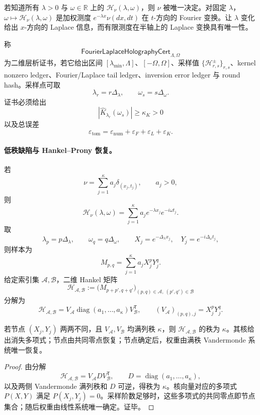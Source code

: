 若知道所有 \(\lambda>0\) 与 \(\omega\in\mathbb R\) 上的 \(\mathcal H_\nu(\lambda,\omega)\)，则 \(\nu\) 被唯一决定。对固定 \(\lambda\)，\(\omega\mapsto\mathcal H_\nu(\lambda,\omega)\) 是加权测度 \(e^{-\lambda x}\nu(dx,dt)\) 在 \(t\)-方向的 Fourier 变换。让 \(\lambda\) 变化给出 \(x\)-方向的 Laplace 信息，而有限测度在半轴上的 Laplace 变换具有唯一性。

\begin{definition}\label{def:typed-address-biaxial-completion-fourier-laplace-holography-cert}
称
\[
\mathsf{FourierLaplaceHolographyCert}_{\Lambda,\Omega}
\]
为二维层析证书，若它给出区间 \([\lambda_{\min},\Lambda]\)、\([-\Omega,\Omega]\)、采样值 \(\{\mathcal H_{r,s}^{\pm}\}_{r,s}\)、kernel nonzero ledger、Fourier/Laplace tail ledger、inversion error ledger 与 round hash。采样点可取
\[
\lambda_r=r\Delta_\lambda,\qquad \omega_s=s\Delta_\omega.
\]
证书必须给出
\[
|\widehat K_{\lambda_r}(\omega_s)|\ge\kappa_K>0
\]
以及总误差
\[
\varepsilon_{\mathrm{tom}}
=
\varepsilon_{\mathrm{num}}+\varepsilon_F+\varepsilon_L+\varepsilon_K.
\]
\end{definition}

\paragraph{低秩缺陷与 Hankel--Prony 恢复。}
若
\[
\nu=\sum_{j=1}^{\kappa}a_j\delta_{(x_j,t_j)},\qquad a_j>0,
\]
则
\[
\mathcal H_\nu(\lambda,\omega)=
\sum_{j=1}^{\kappa}a_j e^{-\lambda x_j}e^{-i\omega t_j}.
\]
取
\[
\lambda_p=p\Delta_\lambda,\qquad
\omega_q=q\Delta_\omega,\qquad
X_j=e^{-\Delta_\lambda x_j},\quad
Y_j=e^{-i\Delta_\omega t_j},
\]
则样本为
\[
\boxed{
M_{p,q}=\sum_{j=1}^{\kappa}a_jX_j^pY_j^q.
}
\]
给定索引集 \(\mathcal A,\mathcal B\)，二维 Hankel 矩阵
\[
\mathcal H_{\mathcal A,\mathcal B}
:=
\bigl(M_{p+p',q+q'}\bigr)_{(p,q)\in\mathcal A,\ (p',q')\in\mathcal B}
\]
分解为
\[
\mathcal H_{\mathcal A,\mathcal B}
=
V_{\mathcal A}\operatorname{diag}(a_1,\ldots,a_\kappa)V_{\mathcal B}^{\mathsf T},
\qquad
(V_{\mathcal A})_{(p,q),j}=X_j^pY_j^q.
\]

\begin{theorem}[低秩缺陷的有限采样恢复]\label{thm:typed-address-biaxial-completion-low-rank-hankel-prony-recovery}
若节点 \((X_j,Y_j)\) 两两不同，且 \(V_{\mathcal A},V_{\mathcal B}\) 均满列秩 \(\kappa\)，则 \(\mathcal H_{\mathcal A,\mathcal B}\) 的秩为 \(\kappa\)。其核给出消失多项式；节点由共同零点恢复；节点确定后，权重由满秩 Vandermonde 系统唯一恢复。
\end{theorem}
\begin{proof}
由分解
\[
\mathcal H_{\mathcal A,\mathcal B}
=
V_{\mathcal A}DV_{\mathcal B}^{\mathsf T},
\qquad
D=\operatorname{diag}(a_1,\ldots,a_\kappa),
\]
以及两侧 Vandermonde 满列秩和 \(D\) 可逆，得秩为 \(\kappa\)。核向量对应的多项式 \(P(X,Y)\) 满足 \(P(X_j,Y_j)=0\)。采样阶数足够时，这些多项式的共同零点即节点集合；随后权重由线性系统唯一确定。证毕。
\end{proof}

